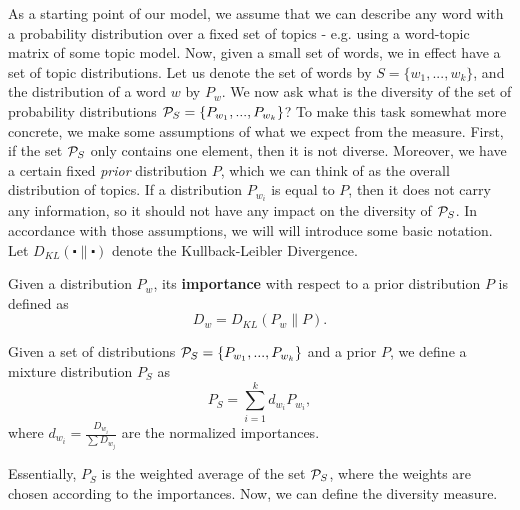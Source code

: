 %
As a starting point of our model, we assume that we can describe any
word with a probability distribution over a fixed set of topics -
e.g. using a word-topic matrix of some topic model. Now, given a small
set of words, we in effect have a set of topic distributions. Let us
denote the set of words by $S=\{w_1,...,w_k\}$, and the distribution
of a word $w$ by $P_w$.  We now ask
what is the diversity of the set of probability
distributions ${\mathcal P}_S=\{P_{w_1},...,P_{w_k}\}$? To make this task
somewhat more concrete, we make some 
assumptions of what we expect from the measure. First, if the set
${\mathcal P}_S$ only contains one element, then it is not diverse. Moreover,
we have a certain fixed {\em prior} distribution $P$, which we
can think of as the overall distribution of topics. If a distribution
$P_{w_i}$ is equal to $P$, then it does not carry any information, so
it should not have any impact on the diversity of ${\mathcal P}_S$. In
accordance with those assumptions, we will will introduce some basic
notation. Let $D_{KL}(\centerdot\|\centerdot)$ denote the
Kullback-Leibler Divergence.

\bed
Given a distribution $P_w$, its {\bf importance} with respect to a
prior distribution $P$ is defined as 
\[D_w = D_{KL}(P_w\|P).\]
\eed

\bed\label{mixture}
Given a set of distributions ${\mathcal P}_S=\{P_{w_1},...,P_{w_k}\}$ and a
prior $P$, we
define a mixture distribution $P_S$ as
\[P_S=\sum_{i=1}^k d_{w_i} P_{w_i},\]
where $d_{w_i}=\frac{D_{w_i}}{\sum D_{w_j}}$ are the normalized
importances.                                                                                                 
\eed

Essentially, $P_S$ is the weighted average of the set ${\mathcal P}_S$, where
the weights are chosen according to the importances. Now, we can
define the diversity measure.

